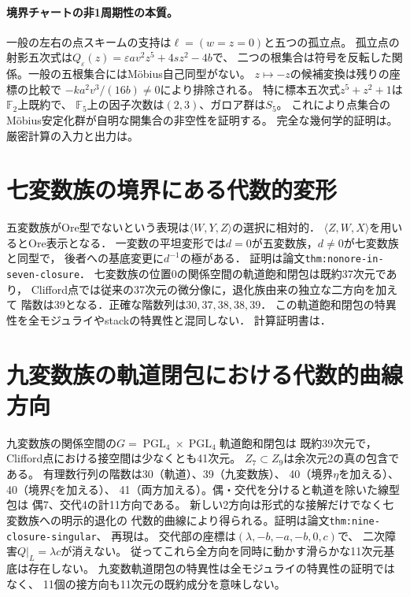 \documentclass[11pt,a4paper]{ltjsarticle}
\newcommand{\PGL}{\operatorname{PGL}}
\begin{document}
\paragraph{境界チャートの非1周期性の本質。}
一般の左右の点スキームの支持は$\ell=(w=z=0)$と五つの孤立点。
孤立点の射影五次式は$Q_\varepsilon(z)=\varepsilon av^2z^5+4sz^2-4b$で、
二つの根集合は符号を反転した関係。一般の五根集合にはMöbius自己同型がない。
$z\mapsto-z$の候補変換は残りの座標の比較で
$-ka^2v^3/(16b)\ne0$により排除される。
特に標本五次式$z^5+z^2+1$は$\mathbb F_2$上既約で、
$\mathbb F_5$上の因子次数は$(2,3)$、ガロア群は$S_5$。
これにより点集合のMöbius安定化群が自明な開集合の非空性を証明する。
完全な幾何学的証明は。
厳密計算の入力と出力は。

\section{七変数族の境界にある代数的変形}
五変数族がOre型でないという表現は$\langle W,Y,Z\rangle$の選択に相対的．
$\langle Z,W,X\rangle$を用いるとOre表示となる．
一変数の平坦変形では$d=0$が五変数族，$d\ne0$が七変数族と同型で，
後者への基底変更に$d^{-1}$の極がある．
証明は論文\texttt{thm:nonore-in-seven-closure}．
七変数族の位置0の関係空間の軌道飽和閉包は既約37次元であり，
Clifford点では従来の37次元の微分像に，退化族由来の独立な二方向を加えて
階数は39となる．正確な階数列は$30,37,38,38,39$．
この軌道飽和閉包の特異性を全モジュライやstackの特異性と混同しない．
計算証明書は．

\section{九変数族の軌道閉包における代数的曲線方向}
九変数族の関係空間の$G=\PGL_4\times\PGL_4$軌道飽和閉包は
既約39次元で，Clifford点における接空間は少なくとも41次元。
$Z_7\subset Z_9$は余次元2の真の包含である。
有理数行列の階数は30（軌道）、39（九変数族）、
40（境界$\eta$を加える）、40（境界$\xi$を加える）、
41（両方加える）。偶・交代を分けると軌道を除いた線型包は
偶7、交代4の計11方向である。
新しい2方向は形式的な接解だけでなく七変数族への明示的退化の
代数的曲線により得られる。証明は論文\texttt{thm:nine-closure-singular}、
再現は。
交代部の座標は$(\lambda,-b,-a,-b,0,c)$で、
二次障害$Q|_L=\lambda c$が消えない。
従ってこれら全方向を同時に動かす滑らかな11次元基底は存在しない。
九変数軌道閉包の特異性は全モジュライの特異性の証明ではなく、
11個の接方向も11次元の既約成分を意味しない。
\end{document}
